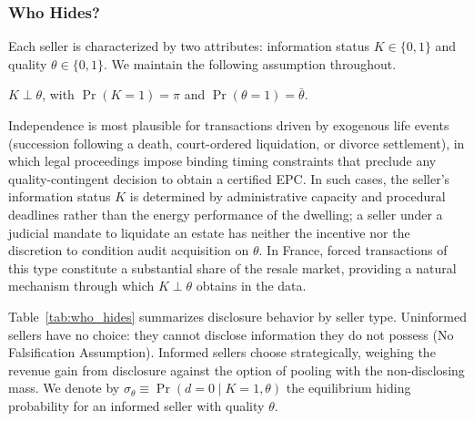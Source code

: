 \documentclass[10pt,letterpaper]{bp-template-concise}
\begin{document}
\subsubsection{Who Hides?}

Each seller is characterized by two attributes: information status $K \in \{0,1\}$ and quality $\theta \in \{0,1\}$. We maintain the following assumption throughout.

\begin{assumption}[Independence]\label{ass:independence}
$K \perp \theta$, with $\Pr(K=1) = \pi$ and $\Pr(\theta=1) = \bar{\theta}$.
\end{assumption}

\noindent Independence is most plausible for transactions driven by exogenous life events (succession following a death, court-ordered liquidation, or divorce settlement), in which legal proceedings impose binding timing constraints that preclude any quality-contingent decision to obtain a certified EPC. In such cases, the seller's information status $K$ is determined by administrative capacity and procedural deadlines rather than the energy performance of the dwelling; a seller under a judicial mandate to liquidate an estate has neither the incentive nor the discretion to condition audit acquisition on $\theta$. In France, forced transactions of this type constitute a substantial share of the resale market, providing a natural mechanism through which $K \perp \theta$ obtains in the data.

Table~\ref{tab:who_hides} summarizes disclosure behavior by seller type. Uninformed sellers have no choice: they cannot disclose information they do not possess (No Falsification Assumption). Informed sellers choose strategically, weighing the revenue gain from disclosure against the option of pooling with the non-disclosing mass. We denote by $\sigma_\theta \equiv \Pr(d=0 \mid K=1, \theta)$ the equilibrium hiding probability for an informed seller with quality $\theta$.
\end{document}
